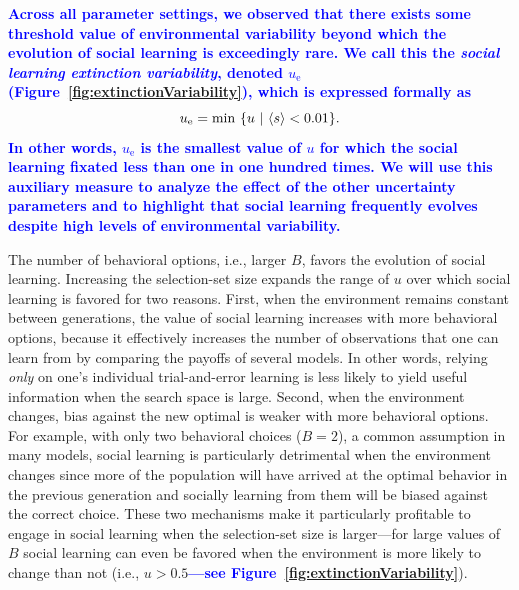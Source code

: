 \documentclass[letterpaper,11.5pt]{scrartcl}
\newcommand{\edit}[1]{{\bfseries \textcolor{blue} {#1}}}
\begin{document}
\edit{Across all parameter settings, we observed that there exists some threshold value of environmental
  variability beyond which the evolution of social learning is exceedingly rare.  We call this the
  \emph{social learning extinction variability}, denoted $u_\text{e}$ (Figure~\ref{fig:extinctionVariability}), which is expressed formally as 
\begin{equation}
  u_\text{e} = \min~\{ u~|~\langle s \rangle < 0.01 \}.
  \label{eq:extinctionVariability}
\end{equation}
\noindent
In other words, $u_\text{e}$ is the smallest value of $u$ for which the social learning fixated
less than one in one hundred times. We will use this auxiliary measure to analyze the effect of
the other uncertainty parameters and to highlight that social learning frequently 
evolves despite high levels of environmental variability.}

The number of behavioral options, i.e., larger $B$, favors the evolution of social learning. Increasing the selection-set size
expands the range of $u$ over which social learning is favored for two reasons. First, when the environment remains constant between
generations, the value of social learning increases with more behavioral options, because it effectively increases the number of
observations that one can learn from by comparing the payoffs of several models. In other words, relying \emph{only} on one's
individual trial-and-error learning is less likely to yield useful information when the search space is
large. Second, when the environment changes, bias against the new optimal is weaker with more behavioral
options. For example, with only two behavioral choices ($B = 2$), a common assumption in many models, social
learning is particularly detrimental when the environment changes since more of the population will have
arrived at the optimal behavior in the previous generation and socially learning from them will be biased
against the correct choice. These two mechanisms make it particularly profitable to engage in social
learning when the selection-set size is larger---for large values of $B$ social learning can even be favored
when the environment is more likely to change than not (i.e.,
$u>0.5$\edit{---see Figure~\ref{fig:extinctionVariability}}). 
\end{document}
